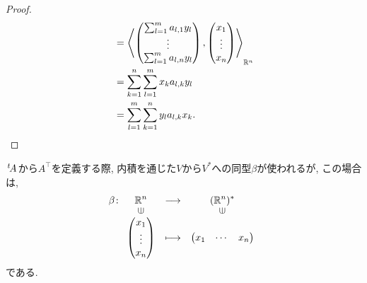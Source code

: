 \begin{proof}
\begin{align*}
    &=\Braket{\begin{pmatrix}\sum_{l=1}^{m}a_{l,1}y_l\\\vdots\\\sum_{l=1}^{m}a_{l,n}y_l\end{pmatrix},\begin{pmatrix}x_1\\\vdots\\x_n\end{pmatrix}}_{\mathbb{R}^n}\\
    &=\sum_{k=1}^n\sum_{l=1}^{m}x_ka_{l,k}y_l\\
    &=\sum_{l=1}^{m}\sum_{k=1}^ny_la_{l,k}x_k.
  \end{align*}
\end{proof}

\begin{remark}
  $\left.^{t}\!A\right.$から$A^\top$を定義する際,
  内積を通じた$V$から$V^\ast$への同型$\beta$が使われるが,
  この場合は,
  \begin{align*}
    \beta\colon
    \Shazo{\RR^n}{(\RR^n)^\ast}
          {\begin{pmatrix}x_1\\\vdots\\x_n\end{pmatrix}}
          {\begin{pmatrix}x_1&\cdots&x_n\end{pmatrix}}
  \end{align*}
  である.
\end{remark}

